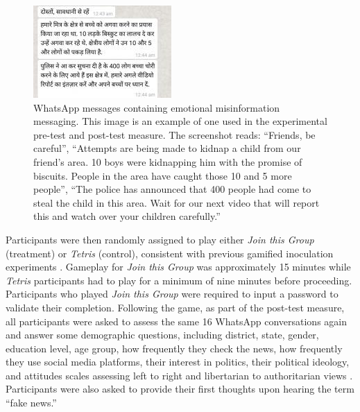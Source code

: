 \documentclass[empirical, authordate, issue]{jote-new-article}
\begin{document}
\begin{figure}

  \begin{fullwidth}
    \includegraphics[width=\linewidth]{media/image1.jpeg}
    \caption{\mbox{WhatsApp} messages containing emotional misinformation messaging. This image is an example of one used in the experimental pre-test and post-test measure. The screenshot reads: “Friends, be careful”, “Attempts are being made to kidnap a child from our friend's area. 10 boys were kidnapping him with the promise of biscuits. People in the area have caught those 10 and 5 more people”, “The police has announced that 400 people had come to steal the child in this area. Wait for our next video that will report this and watch over your children carefully.”}
    \label{fig:figure1}
  \end{fullwidth}


\end{figure}


Participants were then randomly assigned to play either \emph{Join this Group }(treatment) or \emph{Tetris} (control), consistent with previous gamified inoculation experiments \parencite{Basol2020, Roozenbeek2020}. Gameplay for \emph{Join this Group} was approximately 15 minutes while \emph{Tetris} participants had to play for a minimum of nine minutes before proceeding. Participants who played \emph{Join this Group }were\emph{ }required to input a password to validate their completion. Following the game, as part of the post-test measure, all participants were asked to assess the same 16 \mbox{WhatsApp} conversations again and answer some demographic questions, including district, state, gender, education level, age group, how frequently they check the news, how frequently they use social media platforms, their interest in politics, their political ideology, and attitudes scales assessing left to right and libertarian to authoritarian views \parencite{Park2013}. Participants were also asked to provide their first thoughts upon hearing the term “fake news.”
\end{document}
